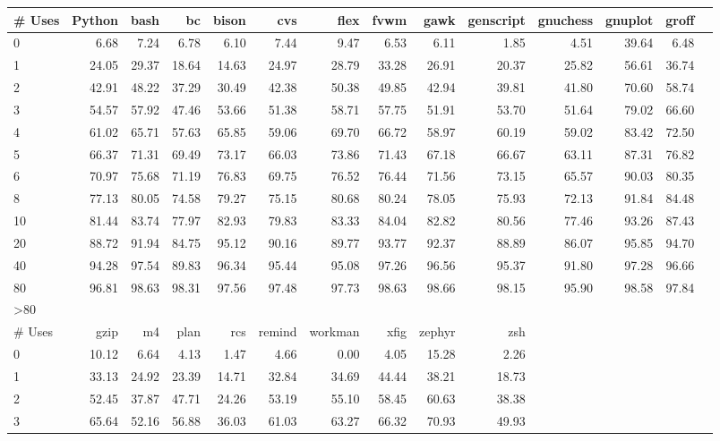 \begin{tabular}{|l|r|r|r|r|r|r|r|r|r|r|r|r|r|}\hline
\# Uses & Python & bash & bc & bison & cvs & flex & fvwm & gawk & genscript & gnuchess & gnuplot & groff\\\hline
0 & 6.68 & 7.24 & 6.78 & 6.10 & 7.44 & 9.47 & 6.53 & 6.11 & 1.85 & 4.51 & 39.64 & 6.48\\\hline
1 & 24.05 & 29.37 & 18.64 & 14.63 & 24.97 & 28.79 & 33.28 & 26.91 & 20.37 & 25.82 & 56.61 & 36.74\\\hline
2 & 42.91 & 48.22 & 37.29 & 30.49 & 42.38 & 50.38 & 49.85 & 42.94 & 39.81 & 41.80 & 70.60 & 58.74\\\hline
3 & 54.57 & 57.92 & 47.46 & 53.66 & 51.38 & 58.71 & 57.75 & 51.91 & 53.70 & 51.64 & 79.02 & 66.60\\\hline
4 & 61.02 & 65.71 & 57.63 & 65.85 & 59.06 & 69.70 & 66.72 & 58.97 & 60.19 & 59.02 & 83.42 & 72.50\\\hline
5 & 66.37 & 71.31 & 69.49 & 73.17 & 66.03 & 73.86 & 71.43 & 67.18 & 66.67 & 63.11 & 87.31 & 76.82\\\hline
6 & 70.97 & 75.68 & 71.19 & 76.83 & 69.75 & 76.52 & 76.44 & 71.56 & 73.15 & 65.57 & 90.03 & 80.35\\\hline
8 & 77.13 & 80.05 & 74.58 & 79.27 & 75.15 & 80.68 & 80.24 & 78.05 & 75.93 & 72.13 & 91.84 & 84.48\\\hline
10 & 81.44 & 83.74 & 77.97 & 82.93 & 79.83 & 83.33 & 84.04 & 82.82 & 80.56 & 77.46 & 93.26 & 87.43\\\hline
20 & 88.72 & 91.94 & 84.75 & 95.12 & 90.16 & 89.77 & 93.77 & 92.37 & 88.89 & 86.07 & 95.85 & 94.70\\\hline
40 & 94.28 & 97.54 & 89.83 & 96.34 & 95.44 & 95.08 & 97.26 & 96.56 & 95.37 & 91.80 & 97.28 & 96.66\\\hline
80 & 96.81 & 98.63 & 98.31 & 97.56 & 97.48 & 97.73 & 98.63 & 98.66 & 98.15 & 95.90 & 98.58 & 97.84\\\hline
>80\\\hline
\# Uses & gzip & m4 & plan & rcs & remind & workman & xfig & zephyr & zsh\\\hline
0 & 10.12 & 6.64 & 4.13 & 1.47 & 4.66 & 0.00 & 4.05 & 15.28 & 2.26\\\hline
1 & 33.13 & 24.92 & 23.39 & 14.71 & 32.84 & 34.69 & 44.44 & 38.21 & 18.73\\\hline
2 & 52.45 & 37.87 & 47.71 & 24.26 & 53.19 & 55.10 & 58.45 & 60.63 & 38.38\\\hline
3 & 65.64 & 52.16 & 56.88 & 36.03 & 61.03 & 63.27 & 66.32 & 70.93 & 49.93\\\hline

\end{tabular}
